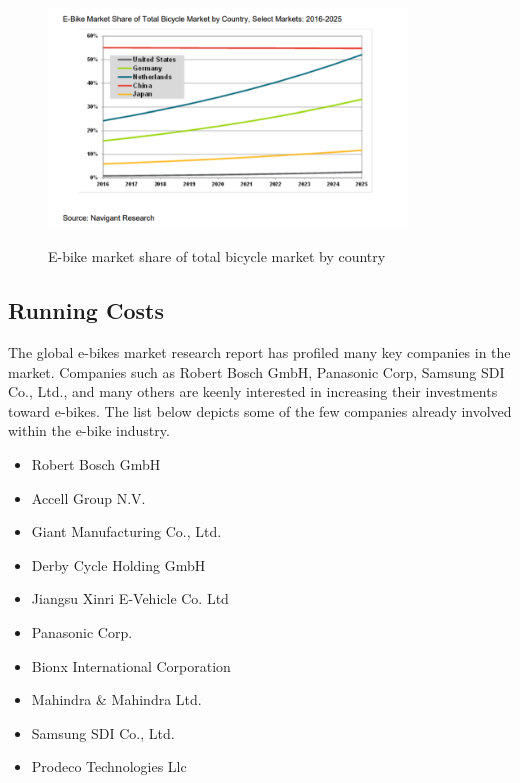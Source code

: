 \documentclass[a4paper,11pt]{article}
\begin{document}
\begin{figure}[!ht]
	\centering
	\includegraphics[width=0.85\textwidth]{ebmarketshare}
	\caption{E-bike market share of total bicycle market by country}
	\cite{citron16}
	\label{fig:inve}
\end{figure}

\newpage

\subsection{Running Costs}
\label{sec:runc}

The global e-bikes market research report has profiled many key companies in the market. Companies such as Robert Bosch GmbH, Panasonic Corp, Samsung SDI Co., Ltd., and many others are keenly interested in increasing their investments toward e-bikes. The list below depicts some of the few companies already involved within the e-bike industry.

\vspace{2em} 
\begin{minipage}[l]{0.45\textwidth}
\begin{itemize}
	\setlength{\itemsep}{0pt}
	\item Robert Bosch GmbH
	\item Accell Group N.V.
	\item Giant Manufacturing Co., Ltd.
	\item Derby Cycle Holding GmbH
	\item Jiangsu Xinri E-Vehicle Co. Ltd
	\end{itemize}
\end{minipage}
\begin{minipage}[r]{0.45\textwidth}
	\begin{itemize}
	\setlength{\itemsep}{0pt}
	\item Panasonic Corp.
	\item Bionx International Corporation
	\item Mahindra \& Mahindra Ltd.
	\item Samsung SDI Co., Ltd.
	\item Prodeco Technologies Llc
\end{itemize}
\end{minipage}
\vspace{2em} 
\end{document}
